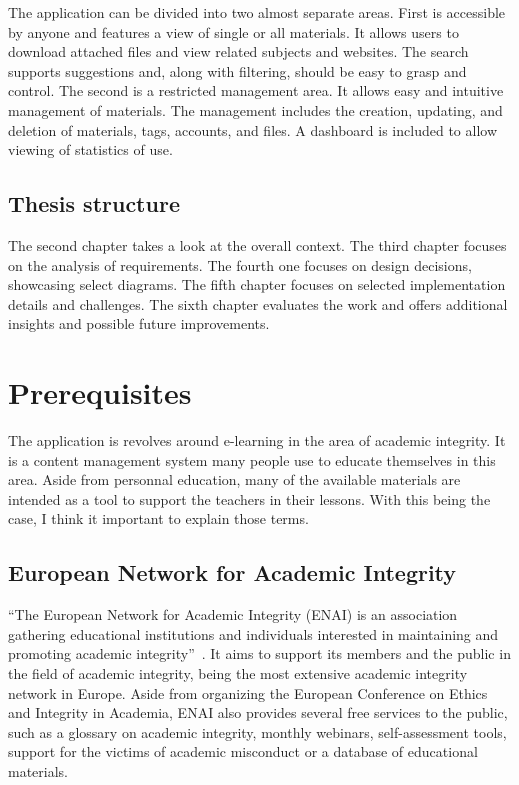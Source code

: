 \documentclass[
  digital,     %
  oneside,     %
  nosansbold,  %
  colorbold, %
  lof,         %
  lot,         %
]{fithesis4}
\begin{document}
The application can be divided into two almost separate areas. First is accessible by anyone
and features a view of single or all materials. It allows users to download attached files and
view related subjects and websites. The search supports suggestions and, along with filtering,
should be easy to grasp and control. The second is a restricted management area. It allows easy
and intuitive management of materials. The management includes the creation, updating, and
deletion of materials, tags, accounts, and files. A dashboard is included to allow viewing of
statistics of use.

\section{Thesis structure}

The second chapter takes a look at the overall context. The third chapter
focuses on the analysis of requirements. The fourth one focuses on design decisions,
showcasing select diagrams. The fifth chapter focuses on selected implementation
details and challenges. The sixth chapter evaluates the work and offers
additional insights and possible future improvements.

\chapter{Prerequisites}

The application is revolves around e-learning in the area of academic integrity.
It is a content management system many people use to educate themselves in this area.
Aside from personnal education, many of the available materials are intended as a tool
to support the teachers in their lessons. With this being the case, I think it important to
explain those terms.

\section{European Network for Academic Integrity}

“The European Network for Academic Integrity (ENAI) is an association gathering
educational institutions and individuals interested in maintaining and promoting
academic integrity”~\cite{enai_about}. It aims to support its members and
the public in the field of academic integrity, being the most extensive academic
integrity network in Europe. Aside from organizing the European Conference on Ethics
and Integrity in Academia, ENAI also provides several free services to the public,
such as a glossary on academic integrity, monthly webinars, self-assessment tools,
support for the victims of academic misconduct or a database of educational materials.
\end{document}
